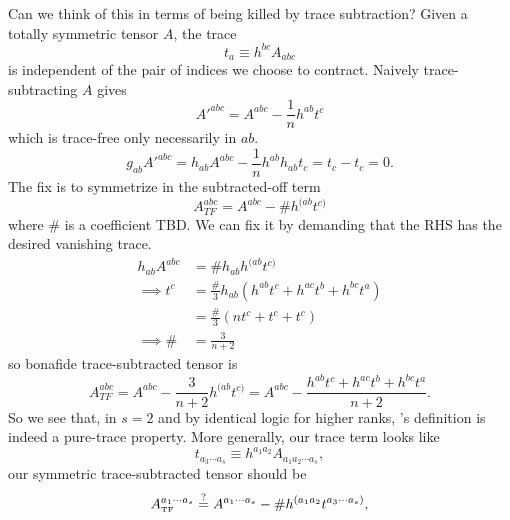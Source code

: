 \documentclass[11pt,letterpaper]{article}
\newcommand{\LP}{\left(}
\newcommand{\RP}{\right)}
\begin{document}
Can we think of this in terms of being killed by trace subtraction? Given a totally symmetric tensor $A$, the trace \begin{equation}
t_a \equiv h^{bc} A_{abc}
\end{equation}
is independent of the pair of indices we choose to contract. Naively trace-subtracting $A$ gives \begin{equation}
{A'}^{abc} = A^{abc} - \frac{1}{n} h^{ab} t^c
\end{equation}
which is trace-free only necessarily in $ab$. \begin{equation}
g_{ab} {A'}^{abc}  = h_{ab} A^{abc} - \frac{1}{n} h^{ab} h_{ab} t_c = t_c - t_c = 0.
\end{equation}
The fix is to symmetrize in the subtracted-off term \begin{equation}
A_{TF}^{abc} = A^{abc} - \# h^{(ab} t^{c)}
\end{equation}
where $\#$ is a coefficient TBD. We can fix it by demanding that the RHS has the desired vanishing trace. \begin{equation}
\begin{aligned}
h_{ab} A^{abc}  & = \# h_{ab} h^{(ab} t^{c)} \\
\implies t^c & = \frac{\#}{3} h_{ab} \LP h^{ab} t^c + h^{ac} t^b + h^{bc} t^a \RP \\
& = \frac{\#}{3} \LP n t^c + t^c + t^c \RP \\
\implies \# & = \frac{3}{n + 2}
\end{aligned}
\end{equation}
so bonafide trace-subtracted tensor is \begin{equation}
A_{TF}^{abc} = A^{abc} -\frac{3}{n+2} h^{(ab} t^{c)} = A^{abc} - \frac{h^{ab} t^c + h^{ac} t^b + h^{bc} t^a}{n+2}.
\end{equation}
So we see that, in $s = 2$ and by identical logic for higher ranks, \cite{Geroch:1970cc}'s definition is indeed a pure-trace property. More generally, our trace term looks like \begin{equation}
t_{a_3 \cdots a_s} \equiv h^{a_1 a_2} A_{a_1 a_2 \cdots a_s},
\end{equation}
our symmetric trace-subtracted tensor should be \begin{equation}
A_{\mbox{\tiny{TF}}}^{a_1 \cdots a_s} \stackrel{?}{=} A^{a_1 \cdots a_s} - \# h^{(a_1 a_2} t^{a_3 \cdots a_s)},
\end{equation}
\end{document}
